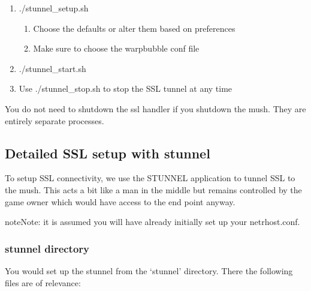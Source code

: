 \documentclass[letterpaper,10pt,english]{sphinxmanual}
\begin{document}
\begin{enumerate}
\item {} 
\sphinxAtStartPar
./stunnel\_setup.sh
\begin{enumerate}
%
\item {} 
\sphinxAtStartPar
Choose the defaults or alter them based on preferences

\item {} 
\sphinxAtStartPar
Make sure to choose the warpbubble conf file

\end{enumerate}

\item {} 
\sphinxAtStartPar
./stunnel\_start.sh

\item {} 
\sphinxAtStartPar
Use ./stunnel\_stop.sh to stop the SSL tunnel at any time

\end{enumerate}

\sphinxAtStartPar
You do not need to shutdown the ssl handler if you shutdown the mush.  They
are entirely separate processes.


\subsection{Detailed SSL setup with stunnel}
\label{\detokenize{security:detailed-ssl-setup-with-stunnel}}
\sphinxAtStartPar
To setup SSL connectivity, we use the STUNNEL application to tunnel SSL to
the mush.  This acts a bit like a man in the middle but remains controlled
by the game owner which would have access to the end point anyway.

\begin{sphinxadmonition}{note}{Note:}
\sphinxAtStartPar
it is assumed you will have already initially set up your netrhost.conf.
\end{sphinxadmonition}


\subsubsection{stunnel directory}
\label{\detokenize{security:stunnel-directory}}
\sphinxAtStartPar
You would set up the stunnel from the ‘stunnel’ directory.  There the following
files are of relevance:
\end{document}
